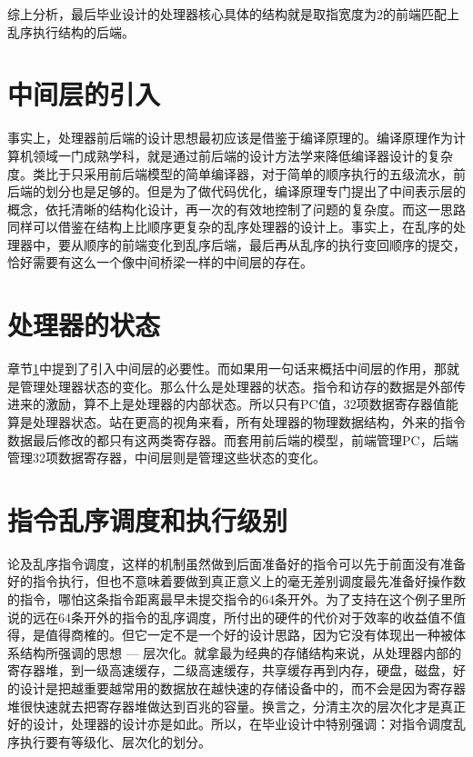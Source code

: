 综上分析，最后毕业设计的处理器核心具体的结构就是取指宽度为2的前端匹配上乱序执行结构的后端。

\section{中间层的引入}\label{subsec:middle_end}
事实上，处理器前后端的设计思想最初应该是借鉴于编译原理的。编译原理作为计算机领域一门成熟学科，就是通过前后端的设计方法学来降低编译器设计的复杂度。类比于只采用前后端模型的简单编译器，对于简单的顺序执行的五级流水，前后端的划分也是足够的。但是为了做代码优化，编译原理专门提出了中间表示层的概念，依托清晰的结构化设计，再一次的有效地控制了问题的复杂度。而这一思路同样可以借鉴在结构上比顺序更复杂的乱序处理器的设计上。事实上，在乱序的处理器中，要从顺序的前端变化到乱序后端，最后再从乱序的执行变回顺序的提交，恰好需要有这么一个像中间桥梁一样的中间层的存在。

\section{处理器的状态}\label{subsec:cpu_state}
章节\ref{subsec:middle_end}中提到了引入中间层的必要性。而如果用一句话来概括中间层的作用，那就是管理处理器状态的变化。那么什么是处理器的状态。指令和访存的数据是外部传进来的激励，算不上是处理器的内部状态。所以只有PC值，32项数据寄存器值能算是处理器状态。站在更高的视角来看，所有处理器的物理数据结构，外来的指令数据最后修改的都只有这两类寄存器。而套用前后端的模型，前端管理PC，后端管理32项数据寄存器，中间层则是管理这些状态的变化。

\section{指令乱序调度和执行级别}\label{subsec:exe_hierarchy}
论及乱序指令调度，这样的机制虽然做到后面准备好的指令可以先于前面没有准备好的指令执行，但也不意味着要做到真正意义上的毫无差别调度最先准备好操作数的指令，哪怕这条指令距离最早未提交指令的64条开外。为了支持在这个例子里所说的远在64条开外的指令的乱序调度，所付出的硬件的代价对于效率的收益值不值得，是值得商榷的。但它一定不是一个好的设计思路，因为它没有体现出一种被体系结构所强调的思想 --- 层次化。就拿最为经典的存储结构来说，从处理器内部的寄存器堆，到一级高速缓存，二级高速缓存，共享缓存再到内存，硬盘，磁盘，好的设计是把越重要越常用的数据放在越快速的存储设备中的，而不会是因为寄存器堆很快速就去把寄存器堆做达到百兆的容量。换言之，分清主次的层次化才是真正好的设计，处理器的设计亦是如此。所以，在毕业设计中特别强调：对指令调度乱序执行要有等级化、层次化的划分。

